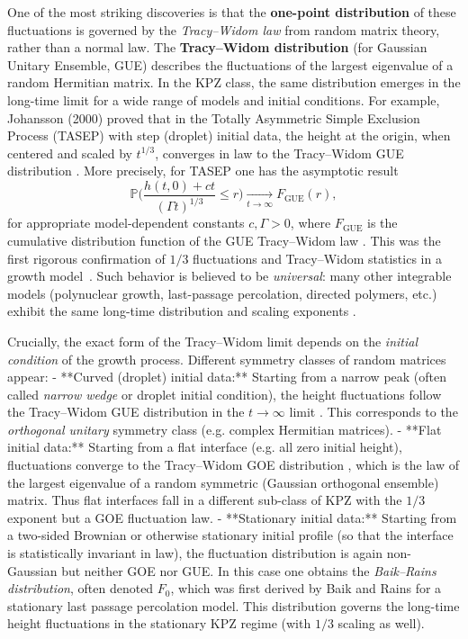 \documentclass[letterpaper,11pt,oneside,reqno]{article}
\numberwithin{equation}{section}
\theoremstyle{definition}
\begin{document}
One of the most striking discoveries is that the \textbf{one-point distribution} of these fluctuations is governed by the \emph{Tracy–Widom law} from random matrix theory, rather than a normal law. The \textbf{Tracy–Widom distribution} (for Gaussian Unitary Ensemble, GUE) describes the fluctuations of the largest eigenvalue of a random Hermitian matrix. In the KPZ class, the same distribution emerges in the long-time limit for a wide range of models and initial conditions. For example, Johansson (2000) proved that in the Totally Asymmetric Simple Exclusion Process (TASEP) with step (droplet) initial data, the height at the origin, when centered and scaled by $t^{1/3}$, converges in law to the Tracy–Widom GUE distribution \cite{remenik2023integrable}. More precisely, for TASEP one has the asymptotic result
\[ \mathbb{P}\!\Big( \frac{h(t,0)+ct}{(\Gamma t)^{1/3}} \le r \Big) \xrightarrow[t\to\infty]{} F_{\mathrm{GUE}}(r), \]
for appropriate model-dependent constants $c,\Gamma>0$, where $F_{\mathrm{GUE}}$ is the cumulative distribution function of the GUE Tracy–Widom law \cite{remenik2023integrable}. This was the first rigorous confirmation of $1/3$ fluctuations and Tracy–Widom statistics in a growth model \cite{johansson2000shape}. Such behavior is believed to be \emph{universal}: many other integrable models (polynuclear growth, last-passage percolation, directed polymers, etc.) exhibit the same long-time distribution and scaling exponents \cite{johansson2000shape}.

Crucially, the exact form of the Tracy–Widom limit depends on the \emph{initial condition} of the growth process. Different symmetry classes of random matrices appear:
- **Curved (droplet) initial data:** Starting from a narrow peak (often called \emph{narrow wedge} or droplet initial condition), the height fluctuations follow the Tracy–Widom GUE distribution in the $t\to\infty$ limit \cite{remenik2023integrable}. This corresponds to the \emph{orthogonal unitary} symmetry class (e.g. complex Hermitian matrices).
- **Flat initial data:** Starting from a flat interface (e.g. all zero initial height), fluctuations converge to the Tracy–Widom GOE distribution \cite{remenik2023integrable}, which is the law of the largest eigenvalue of a random symmetric (Gaussian orthogonal ensemble) matrix. Thus flat interfaces fall in a different sub-class of KPZ with the $1/3$ exponent but a GOE fluctuation law.
- **Stationary initial data:** Starting from a two-sided Brownian or otherwise stationary initial profile (so that the interface is statistically invariant in law), the fluctuation distribution is again non-Gaussian but neither GOE nor GUE. In this case one obtains the \emph{Baik–Rains distribution}, often denoted $F_0$, which was first derived by Baik and Rains for a stationary last passage percolation model. This distribution governs the long-time height fluctuations in the stationary KPZ regime (with $1/3$ scaling as well).
\end{document}
